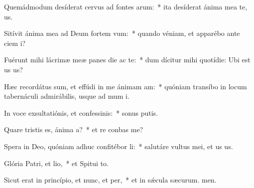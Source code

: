 \item Quemádmodum desíderat cervus ad fontes arum:~* ita desíderat ánima mea  te, us.
\item Sitívit ánima mea ad Deum fortem vum:~* quando véniam, et apparébo ante ciem i?
\item Fuérunt mihi lácrimæ meæ panes die ac te:~* dum dícitur mihi quotídie: Ubi est us us?
\item Hæc recordátus sum, et effúdi in me ánimam am:~* quóniam transíbo in locum tabernáculi admirábilis, usque ad mum i.
\item In voce exsultatiónis, et confessinis:~* sonus putis.
\item Quare tristis es, ánima a?~* et re conbas me?
\item Spera in Deo, quóniam adhuc confitébor li:~* salutáre vultus mei, et us us.
\item Glória Patri, et lio,~* et Spitui to.
\item Sicut erat in princípio, et nunc, et per,~* et in sǽcula sæcurum. men.
